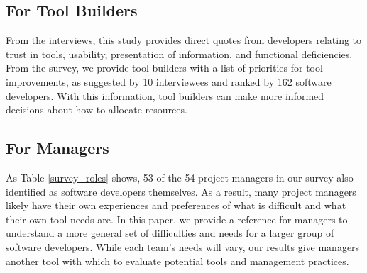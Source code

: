  

\subsection{For Tool Builders}
From the interviews, this study provides direct quotes from developers relating to trust in tools, usability, presentation of information, and functional deficiencies. From the survey, we provide tool builders with a list of priorities for tool improvements, as suggested by 10 interviewees and ranked by 162 software developers. With this information, tool builders can make more informed decisions about how to allocate resources.

\subsection{For Managers}
As Table \ref{survey_roles} shows, 53 of the 54 project managers in our survey also identified as software developers themselves. As a result, many project managers likely have their own experiences and preferences of what is difficult and what their own tool needs are. In this paper, we provide a reference for managers to understand a more general set of difficulties and needs for a larger group of software developers. While each team's needs will vary, our results give managers another tool with which to evaluate potential tools and management practices.